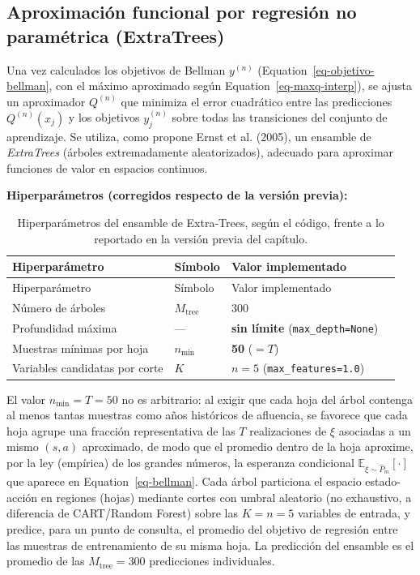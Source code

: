 \documentclass[
  letterpaper,
  DIV=11,
  numbers=noendperiod]{scrreprt}
\theoremstyle{definition}
\theoremstyle{remark}
\begin{document}
\subsection{Aproximación funcional por regresión no paramétrica
(ExtraTrees)}\label{aproximaciuxf3n-funcional-por-regresiuxf3n-no-paramuxe9trica-extratrees-1}

Una vez calculados los objetivos de Bellman \(y^{(n)}\)
(Equation~\ref{eq-objetivo-bellman}, con el máximo aproximado según
Equation~\ref{eq-maxq-interp}), se ajusta un aproximador \(Q^{(n)}\) que
minimiza el error cuadrático entre las predicciones \(Q^{(n)}(x_j)\) y
los objetivos \(y^{(n)}_j\) sobre todas las transiciones del conjunto de
aprendizaje. Se utiliza, como propone Ernst et al. (2005), un ensamble
de \emph{ExtraTrees} (árboles extremadamente aleatorizados), adecuado
para aproximar funciones de valor en espacios continuos.

\textbf{Hiperparámetros (corregidos respecto de la versión previa):}

\begin{longtable}[]{@{}llll@{}}
\caption{Hiperparámetros del ensamble de Extra-Trees, según el código,
frente a lo reportado en la versión previa del
capítulo.}\label{tbl-hiperparametros}\tabularnewline
\toprule\noalign{}
Hiperparámetro & Símbolo & Valor implementado & \\
\midrule\noalign{}
\endfirsthead
\toprule\noalign{}
Hiperparámetro & Símbolo & Valor implementado & \\
\midrule\noalign{}
\endhead
\bottomrule\noalign{}
\endlastfoot
Número de árboles & \(M_{\text{tree}}\) & 300 & \\
Profundidad máxima & --- & \textbf{sin límite}
(\texttt{max\_depth=None}) & \\
Muestras mínimas por hoja & \(n_{\min}\) & \textbf{50} (\(=T\)) & \\
Variables candidatas por corte & \(K\) & \(n=5\)
(\texttt{max\_features=1.0}) & \\
\end{longtable}

El valor \(n_{\min}=T=50\) no es arbitrario: al exigir que cada hoja del
árbol contenga al menos tantas muestras como años históricos de
afluencia, se favorece que cada hoja agrupe una fracción representativa
de las \(T\) realizaciones de \(\xi\) asociadas a un mismo \((s,a)\)
aproximado, de modo que el promedio dentro de la hoja aproxime, por la
ley (empírica) de los grandes números, la esperanza condicional
\(\mathbb E_{\xi\sim\widehat P_m}[\cdot]\) que aparece en
Equation~\ref{eq-bellman}. Cada árbol particiona el espacio
estado-acción en regiones (hojas) mediante cortes con umbral aleatorio
(no exhaustivo, a diferencia de CART/Random Forest) sobre las \(K=n=5\)
variables de entrada, y predice, para un punto de consulta, el promedio
del objetivo de regresión entre las muestras de entrenamiento de su
misma hoja. La predicción del ensamble es el promedio de las
\(M_{\text{tree}}=300\) predicciones individuales.
\end{document}
